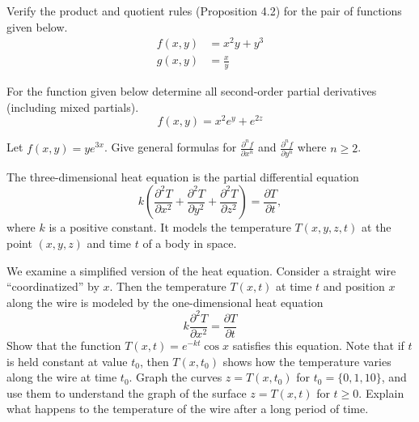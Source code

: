 \documentclass[oneperpage]{gsypset}
\begin{document}
	\begin{problem}[2.4.5]
		Verify the product and quotient rules (Proposition 4.2) for the pair of functions given below.
		\begin{align*}
			f(x,y) &= x^2y + y^3 \\
			g(x,y) &= \frac{x}{y}
		\end{align*}
	\end{problem}
	\begin{solution}
		
	\end{solution}
	
	\begin{problem}[2.4.17]
		For the function given below determine all second-order partial derivatives
		(including mixed partials).
		\[
			f(x,y) = x^2e^y + e^{2z}
		\]
	\end{problem}
	\begin{solution}
		
	\end{solution}
	
	\begin{problem}[2.4.23]
		Let $f(x,y) = ye^{3x}$.
		Give general formulas for 
		$\frac{\partial^n f}{\partial x^n}$ and $\frac{\partial^n f}{\partial y^n}$
		where $n \geq 2$.
	\end{problem}
	\begin{solution}
		
	\end{solution}
	
	\begin{problem}[2.4.29a]
		The three-dimensional heat equation is the partial differential equation
		\[
			k \left(
					\frac{\partial^2 T}{\partial x^2} +
					\frac{\partial^2 T}{\partial y^2} +
					\frac{\partial^2 T}{\partial z^2}
				\right)
				= \frac{\partial T}{\partial t},
		\]
		where $k$ is a positive constant. 
		It models the temperature $T(x,y,z,t)$ at the point $(x,y,z)$ and time $t$ of a body in space.
		\begin{subproblems}[(a)]
			\subproblem
				We examine a simplified version of the heat equation. 
				Consider a straight wire ``coordinatized'' by $x$. 
				Then the temperature $T(x, t)$ at time $t$ and position $x$ along the wire is modeled by 
				the one-dimensional heat equation
				\[
					k \frac{\partial^2 T}{\partial x^2} = \frac{\partial T}{\partial t}
				\]
				Show that the function $T(x, t) = e^{-kt} \cos x$ satisfies this equation. 
				Note that if $t$ is held constant at value $t_0$, then $T(x , t_0)$ shows how 
				the temperature varies along the wire at time $t_0$. 
				Graph the curves $z = T(x,t_0)$ for $t_0 = \{0,1, 10\}$, 
				and use them to understand the graph of the surface $z = T (x , t)$ for $t \geq 0$. 
				Explain what happens to the temperature of the wire after a long period of time.
				\begin{solution}
					
				\end{solution}
		\end{subproblems}
	\end{problem}
\end{document}
